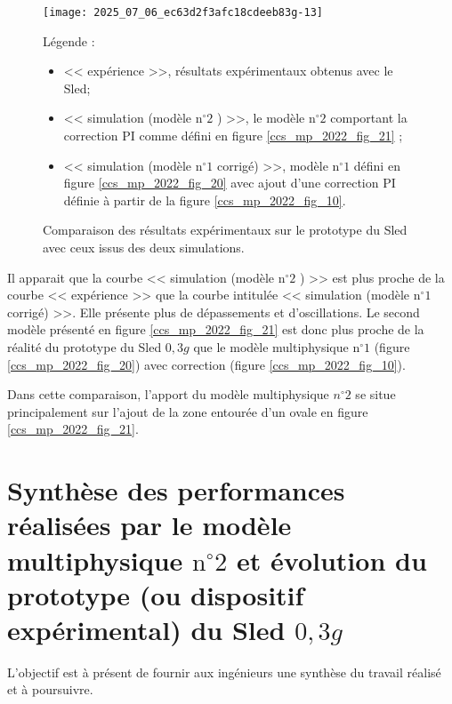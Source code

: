 \begin{figure}[!h]
\centering

\texttt{[image: 2025\_07\_06\_ec63d2f3afc18cdeeb83g-13]}

\caption{\label{ccs_mp_2022_fig_18}Comparaison des résultats expérimentaux sur le prototype du Sled avec ceux issus des deux simulations. }
Légende :

\begin{itemize}
  \item << expérience >>, résultats expérimentaux obtenus avec le Sled;
  \item << simulation (modèle $\mathrm{n}^{\circ} 2$ ) >>, le modèle $\mathrm{n}^{\circ} 2$ comportant la correction PI comme défini en figure \ref{ccs_mp_2022_fig_21} ;
  \item << simulation (modèle $\mathrm{n}^{\circ} 1$ corrigé) >>, modèle $\mathrm{n}^{\circ} 1$ défini en figure \ref{ccs_mp_2022_fig_20} avec ajout d'une correction PI définie à partir de la figure \ref{ccs_mp_2022_fig_10}.
\end{itemize}
\end{figure}


Il apparait que la courbe << simulation (modèle $\mathrm{n}^{\circ} 2$ ) >> est plus proche de la courbe << expérience >> que la courbe intitulée << simulation (modèle $\mathrm{n}^{\circ} 1$ corrigé) >>. Elle présente plus de dépassements et d'oscillations. Le second modèle présenté en figure \ref{ccs_mp_2022_fig_21} est donc plus proche de la réalité du prototype du Sled $0,3 g$ que le modèle multiphysique $\mathrm{n}^{\circ} 1$ (figure \ref{ccs_mp_2022_fig_20}) avec correction (figure \ref{ccs_mp_2022_fig_10}).

Dans cette comparaison, l'apport du modèle multiphysique $n^{\circ} 2$ se situe principalement sur l'ajout de la zone entourée d'un ovale en figure \ref{ccs_mp_2022_fig_21}.



\section{Synthèse des performances réalisées par le modèle multiphysique $\mathrm{n}^{\circ} 2$ et évolution du prototype (ou dispositif expérimental) du Sled $0,3 g$ \label{ccs_mp_2022_sec_5}}
$\qquad$\\
L'objectif est à présent de fournir aux ingénieurs une synthèse du travail réalisé et à poursuivre.

